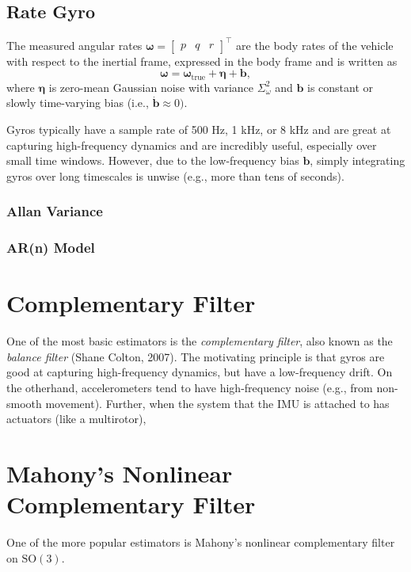 \documentclass[a4paper]{article}
\begin{document}
\subsection*{Rate Gyro}
The measured angular rates $\bm{\omega} = \begin{bmatrix}p&q&r\end{bmatrix}^\top$ are the body rates of the vehicle with respect to the inertial frame, expressed in the body frame and is written as
\begin{equation}
    \bm{\omega} = \bm{\omega}_\text{true} + \bm{\eta} + \bm{b},
\end{equation}
where $\bm{\eta}$ is zero-mean Gaussian noise with variance $\Sigma^2_\omega$ and $\bm{b}$ is constant or slowly time-varying bias (i.e., $\dot{\bm b}\approx 0)$.

Gyros typically have a sample rate of 500 Hz, 1 kHz, or 8 kHz and are great at capturing high-frequency dynamics and are incredibly useful, especially over small time windows.
However, due to the low-frequency bias $\bm{b}$, simply integrating gyros over long timescales is unwise (e.g., more than tens of seconds).

\subsubsection*{Allan Variance}
\subsubsection*{AR(n) Model}

\section*{Complementary Filter}
One of the most basic estimators is the \textit{complementary filter}, also known as the \textit{balance filter} (Shane Colton, 2007).
The motivating principle is that gyros are good at capturing high-frequency dynamics, but have a low-frequency drift.
On the otherhand, accelerometers tend to have high-frequency noise (e.g., from non-smooth movement).
Further, when the system that the IMU is attached to has actuators (like a multirotor), 

\section*{Mahony's Nonlinear Complementary Filter}
One of the more popular estimators is Mahony's nonlinear complementary filter on $\mathrm{SO}(3)$.
\end{document}
